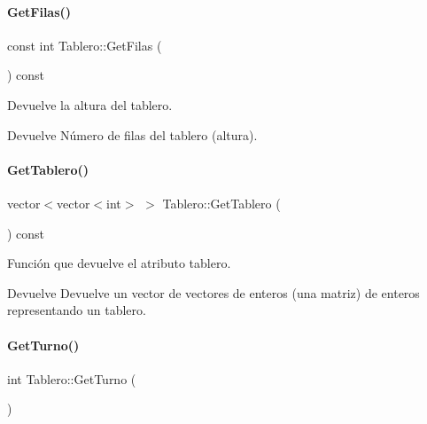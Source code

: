 \paragraph{\texorpdfstring{Get\+Filas()}{GetFilas()}}
{\footnotesize\ttfamily const int Tablero\+::\+Get\+Filas (\begin{DoxyParamCaption}{ }\end{DoxyParamCaption}) const\hspace{0.3cm}{\ttfamily [inline]}}



Devuelve la altura del tablero. 

\begin{DoxyReturn}{Devuelve}
Número de filas del tablero (altura). 
\end{DoxyReturn}
\hypertarget{classTablero_aa898aa59dd1d99df69b9f97ce51f33db}{}\label{classTablero_aa898aa59dd1d99df69b9f97ce51f33db} 
\paragraph{\texorpdfstring{Get\+Tablero()}{GetTablero()}}
{\footnotesize\ttfamily vector$<$vector$<$int$>$ $>$ Tablero\+::\+Get\+Tablero (\begin{DoxyParamCaption}{ }\end{DoxyParamCaption}) const\hspace{0.3cm}{\ttfamily [inline]}}



Función que devuelve el atributo tablero. 

\begin{DoxyReturn}{Devuelve}
Devuelve un vector de vectores de enteros (una matriz) de enteros representando un tablero. 
\end{DoxyReturn}
\hypertarget{classTablero_abf7a05a4b7463c1bd605d0b0a04add4f}{}\label{classTablero_abf7a05a4b7463c1bd605d0b0a04add4f} 
\paragraph{\texorpdfstring{Get\+Turno()}{GetTurno()}}
{\footnotesize\ttfamily int Tablero\+::\+Get\+Turno (\begin{DoxyParamCaption}{ }\end{DoxyParamCaption})\hspace{0.3cm}{\ttfamily [inline]}}



